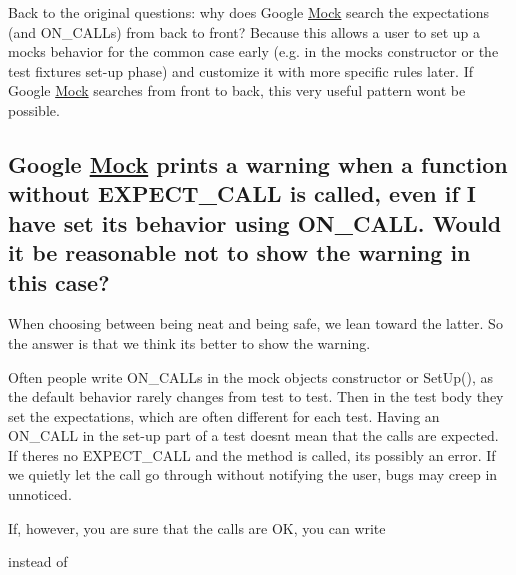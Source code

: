 Back to the original questions\+: why does Google \mbox{\hyperlink{class_mock}{Mock}} search the expectations (and {\ttfamily O\+N\+\_\+\+C\+A\+LL}s) from back to front? Because this allows a user to set up a mock\textquotesingle{}s behavior for the common case early (e.\+g. in the mock\textquotesingle{}s constructor or the test fixture\textquotesingle{}s set-\/up phase) and customize it with more specific rules later. If Google \mbox{\hyperlink{class_mock}{Mock}} searches from front to back, this very useful pattern won\textquotesingle{}t be possible.

\subsection*{Google \mbox{\hyperlink{class_mock}{Mock}} prints a warning when a function without E\+X\+P\+E\+C\+T\+\_\+\+C\+A\+LL is called, even if I have set its behavior using O\+N\+\_\+\+C\+A\+LL. Would it be reasonable not to show the warning in this case?}

When choosing between being neat and being safe, we lean toward the latter. So the answer is that we think it\textquotesingle{}s better to show the warning.

Often people write {\ttfamily O\+N\+\_\+\+C\+A\+LL}s in the mock object\textquotesingle{}s constructor or {\ttfamily Set\+Up()}, as the default behavior rarely changes from test to test. Then in the test body they set the expectations, which are often different for each test. Having an {\ttfamily O\+N\+\_\+\+C\+A\+LL} in the set-\/up part of a test doesn\textquotesingle{}t mean that the calls are expected. If there\textquotesingle{}s no {\ttfamily E\+X\+P\+E\+C\+T\+\_\+\+C\+A\+LL} and the method is called, it\textquotesingle{}s possibly an error. If we quietly let the call go through without notifying the user, bugs may creep in unnoticed.

If, however, you are sure that the calls are OK, you can write


\begin{DoxyCode}{0}
\end{DoxyCode}


instead of


\begin{DoxyCode}{0}
\end{DoxyCode}


